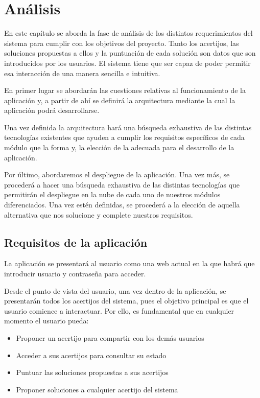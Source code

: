 \chapter{Análisis}
En este capítulo se aborda la fase de análisis de los distintos requerimientos  del sistema para cumplir con los objetivos del proyecto. Tanto los acertijos, las soluciones propuestas a ellos y la puntuación de cada solución son datos que son introducidos por los usuarios. El sistema tiene que ser capaz de poder permitir esa interacción de una manera sencilla e intuitiva.

En primer lugar se abordarán las cuestiones relativas al funcionamiento de la aplicación y, a partir de ahí se definirá la arquitectura mediante la cual la aplicación podrá desarrollarse.

Una vez definida la arquitectura hará una búsqueda exhaustiva de las distintas tecnologías existentes que ayuden a cumplir los requisitos específicos de cada módulo que la forma y, la elección de la adecuada para el desarrollo de la aplicación.

Por último, abordaremos el despliegue de la aplicación. Una vez más, se procederá a hacer una búsqueda exhaustiva de las distintas tecnologías que permitirán el despliegue en la nube de cada uno de nuestros módulos diferenciados. Una vez estén definidas, se procederá a la elección de aquella alternativa que nos solucione y complete nuestros requisitos.

\section{Requisitos de la aplicación}

La aplicación se presentará al usuario como una web actual en la que habrá que introducir usuario y contraseña para acceder. 

Desde el punto de vista del usuario, una vez dentro de la aplicación, se presentarán todos los acertijos del sistema, pues el objetivo principal es que el usuario comience a interactuar. Por ello, es fundamental que en cualquier momento el usuario pueda:

\begin{itemize}
    \item Proponer un acertijo para compartir con los demás usuarios
    \item Acceder a sus acertijos para consultar su estado
    \item Puntuar las soluciones propuestas a sus acertijos
    \item Proponer soluciones a cualquier acertijo del sistema
\end{itemize}

